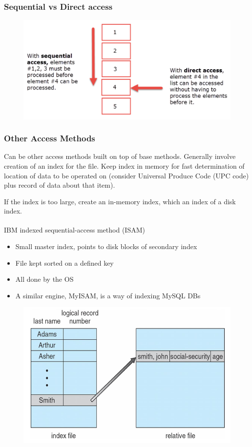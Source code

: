 \subsubsection{Sequential vs Direct access}


\begin{figure}[h!]
    \centering
    \includegraphics[width=0.5\linewidth]{img/mhfg.png}
\end{figure}

\subsubsection{Other Access Methods}

Can be other access methods built on top of base methods. Generally involve creation of an index for the file. Keep index in memory for fast determination of location of data to be
operated on (consider Universal Produce Code (UPC code) plus record
of data about that item).

If the index is too large, create an in-memory index, which an index of a
disk index.
\paragraph{}
IBM indexed sequential-access method (ISAM)

\begin{itemize}
    \item Small master index, points to disk blocks of secondary index
    \item File kept sorted on a defined key
    \item All done by the OS
    \item A similar engine, MyISAM, is a way of indexing MySQL DBs
\end{itemize}

\begin{figure}[h!]
    \centering
    \includegraphics[width=0.5\linewidth]{img/dfb.png}
\end{figure}


